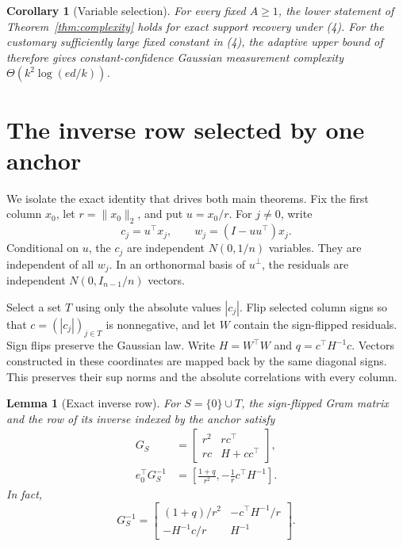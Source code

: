 \documentclass[twoside]{article}
\newtheorem{lemma}[theorem]{Lemma}
\newtheorem{corollary}[theorem]{Corollary}
\begin{document}
\begin{corollary}[Variable selection]
\label{cor:selection}
For every fixed $A\geq1$, the lower statement of
Theorem~\ref{thm:complexity} holds for exact support recovery under (4).
For the customary sufficiently large fixed constant in (4), the adaptive upper
bound of \citet{chen2026adaptive} therefore gives constant-confidence Gaussian
measurement complexity
$\Theta(k^2\log(ed/k))$.
\end{corollary}

\section{The inverse row selected by one anchor}
\label{sec:inverse}

We isolate the exact identity that drives both main theorems. Fix the first
column $x_0$, let $r=\|x_0\|_2$, and put $u=x_0/r$. For $j\neq0$, write
\[
 c_j=u^\top x_j,
 \qquad w_j=(I-uu^\top)x_j.
 \tag{5}
\]
Conditional on $u$, the $c_j$ are independent $N(0,1/n)$ variables. They are
independent of all $w_j$. In an orthonormal basis of $u^\perp$, the residuals
are independent $N(0,I_{n-1}/n)$ vectors.

Select a set $T$ using only the absolute values $|c_j|$. Flip selected column
signs so that $c=(|c_j|)_{j\in T}$ is nonnegative, and let $W$ contain the
sign-flipped residuals. Sign flips preserve the Gaussian law. Write
$H=W^\top W$ and $q=c^\top H^{-1}c$. Vectors constructed in these coordinates
are mapped back by the same diagonal signs. This preserves their sup norms and
the absolute correlations with every column.

\begin{lemma}[Exact inverse row]
\label{lem:block}
For $S=\{0\}\cup T$, the sign-flipped Gram matrix and the row of its inverse
indexed by the anchor satisfy
\begin{align}
 G_S&=
 \begin{bmatrix}
 r^2&r c^\top\\
 r c&H+cc^\top
 \end{bmatrix},
 \tag{6}\\
 e_0^\top G_S^{-1}
 &=\left[\frac{1+q}{r^2},-\frac1r c^\top H^{-1}\right].
 \tag{7}
\end{align}
In fact,
\[
 G_S^{-1}=
 \begin{bmatrix}
 (1+q)/r^2&-c^\top H^{-1}/r\\
 -H^{-1}c/r&H^{-1}
 \end{bmatrix}.
 \tag{8}
\]
\end{lemma}
\end{document}
